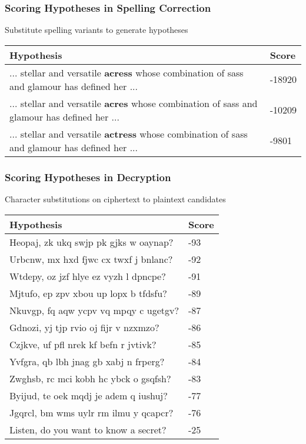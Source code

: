 \begin{frame}
\frametitle{Scoring Hypotheses in Spelling Correction}
\centering
\begin{block}{Substitute spelling variants to generate hypotheses}
\begin{tabular}{p{8cm}l}
\rowcolor{MidnightBlue!50}
Hypothesis & Score \\
\hline
... stellar and versatile {\color{MidnightBlue}\textbf{acress}} whose combination of sass and glamour has defined her ... & -18920 \\
... stellar and versatile {\color{MidnightBlue}\textbf{acres}} whose combination of sass and glamour has defined her ... & -10209 \\
... stellar and versatile {\color{MidnightBlue}\textbf{actress}} whose combination of sass and glamour has defined her ... & -9801
\end{tabular}
\end{block}
\end{frame}

\begin{frame}
\frametitle{Scoring Hypotheses in Decryption}
\centering
\begin{block}{Character substitutions on ciphertext to plaintext candidates}
\begin{tabular}{ll}
\rowcolor{MidnightBlue!50}
Hypothesis & Score \\
\hline
Heopaj, zk ukq swjp pk gjks w oaynap? & -93\\
Urbcnw, mx hxd fjwc cx twxf j bnlanc? & -92\\
Wtdepy, oz jzf hlye ez vyzh l dpncpe? & -91\\
Mjtufo, ep zpv xbou up lopx b tfdsfu? & -89\\
Nkuvgp, fq aqw ycpv vq mpqy c ugetgv? & -87\\
Gdnozi, yj tjp rvio oj fijr v nzxmzo? & -86\\
Czjkve, uf pfl nrek kf befn r jvtivk? & -85\\
Yvfgra, qb lbh jnag gb xabj n frperg? & -84\\
Zwghsb, rc mci kobh hc ybck o gsqfsh? & -83\\
Byijud, te oek mqdj je adem q iushuj? & -77\\
Jgqrcl, bm wms uylr rm ilmu y qcapcr? & -76\\
Listen, do you want to know a secret? & -25\\
\end{tabular}
\end{block}
\end{frame}

